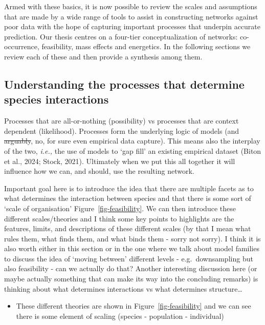 \documentclass[
]{article}
\providecommand{\tightlist}{%
  \setlength{\itemsep}{0pt}\setlength{\parskip}{0pt}}\usepackage{longtable,booktabs,array}
\begin{document}
Armed with these basics, it is now possible to review the scales and
assumptions that are made by a wide range of tools to assist in
constructing networks against poor data with the hope of capturing
important processes that underpin accurate prediction. Our thesis
centres on a four-tier conceptualization of networks: co-occurrence,
feasibility, mass effects and energetics. In the following sections we
review each of these and then provide a synthesis among them.

\subsection{Understanding the processes that determine species
interactions}\label{sec-process}

Processes that are all-or-nothing (possibility) vs processes that are
context dependent (likelihood). Processes form the underlying logic of
models (and \st{arguably}, no, for sure even empirical data capture).
This means also the interplay of the two, \emph{i.e.,} the use of models
to `gap fill' an existing empirical dataset (Biton et al., 2024; Stock,
2021). Ultimately when we put this all together it will influence how we
can, and should, use the resulting network.

Important goal here is to introduce the idea that there are multiple
facets as to what determines the interaction between species and that
there is some sort of `scale of organisation'
Figure~\ref{fig-feasibility}. We can then introduce these different
scales/theories and I think some key points to highlights are the
features, limits, and descriptions of these different scales (by that I
mean what rules them, what finds them, and what binds them - sorry not
sorry). I think it is also worth either in this section or in the one
where we talk about model families to discuss the idea of `moving
between' different levels - e.g.~downsampling but also feasibility - can
we actually do that? Another interesting discussion here (or maybe
actually something that can make its way into the concluding remarks) is
thinking about what determines interactions vs what determines
structure\ldots{}

\begin{itemize}
\tightlist
\item
  These different theories are shown in Figure~\ref{fig-feasibility} and
  we can see there is some element of scaling (species - population -
  individual)
\end{itemize}
\end{document}
